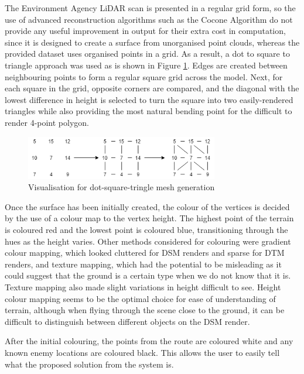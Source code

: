 \documentclass[12pt,a4paper]{article}
\begin{document}
  The Environment Agency LiDAR scan is presented in a regular grid form, so the use of advanced reconstruction algorithms such as the Cocone Algorithm do not provide any useful improvement in output for their extra cost in computation, since it is designed to create a surface from unorganised point clouds, whereas the provided dataset uses organised points in a grid. As a result, a dot to square to triangle approach was used as is shown in Figure \ref{dot_square_triangle_fig}. Edges are created between neighbouring points to form a regular square grid across the model. Next, for each square in the grid, opposite corners are compared, and the diagonal with the lowest difference in height is selected to turn the square into two easily-rendered triangles while also providing the most natural bending point for the difficult to render 4-point polygon.
  \begin{figure}[htb]
    \centering
    \includegraphics[width=0.75\textwidth]{dot_square_triangle}
    \caption{Visualisation for dot-square-tringle mesh generation}
    \label{dot_square_triangle_fig}
  \end{figure}

  \par Once the surface has been initially created, the colour of the vertices is decided by the use of a colour map to the vertex height. The highest point of the terrain is coloured red and the lowest point is coloured blue, transitioning through the hues as the height varies. Other methods considered for colouring were gradient colour mapping, which looked cluttered for DSM renders and sparse for DTM renders, and texture mapping, which had the potential to be misleading as it could suggest that the ground is a certain type when we do not know that it is. Texture mapping also made slight variations in height difficult to see. Height colour mapping seems to be the optimal choice for ease of understanding of terrain, although when flying through the scene close to the ground, it can be difficult to distinguish between different objects on the DSM render.
  \par After the initial colouring, the points from the route are coloured white and any known enemy locations are coloured black. This allows the user to easily tell what the proposed solution from the system is.
\end{document}

